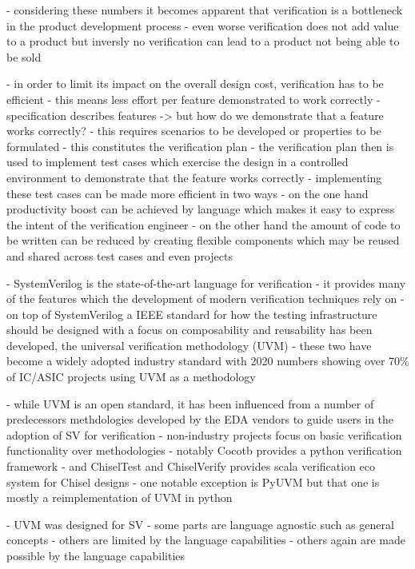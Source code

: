 - considering these numbers it becomes apparent that verification is a bottleneck in the product development process
- even worse verification does not add value to a product but inversly no verification can lead to a product not being able to be sold

- in order to limit its impact on the overall design cost, verification has to be efficient
- this means less effort per feature demonstrated to work correctly
- specification describes features -> but how do we demonstrate that a feature works correctly?
  - this requires scenarios to be developed or properties to be formulated
  - this constitutes the verification plan
- the verification plan then is used to implement test cases which exercise the design in a controlled environment to demonstrate that the feature works correctly
- implementing these test cases can be made more efficient in two ways
- on the one hand productivity boost can be achieved by language which makes it easy to express the intent of the verification engineer
- on the other hand the amount of code to be written can be reduced by creating flexible components which may be reused and shared across test cases and even projects

- SystemVerilog is the state-of-the-art language for verification
- it provides many of the features which the development of modern verification techniques rely on
- on top of SystemVerilog a IEEE standard for how the testing infrastructure should be designed with a focus on composability and reusability has been developed, the universal verification methodology (UVM)
- these two have become a widely adopted industry standard with 2020 numbers showing over 70\% of IC/ASIC projects using UVM as a methodology \cite{foster2020wilson}


- while UVM is an open standard, it has been influenced from a number of predecessors methdologies developed by the EDA vendors to guide users in the adoption of SV for verification
- non-industry projects focus on basic verification functionality over methodologies
- notably Cocotb provides a python verification framework 
- and ChiselTest and ChiselVerify provides scala verification eco system for Chisel designs
- one notable exception is PyUVM but that one is mostly a reimplementation of UVM in python

- UVM was designed for SV
- some parts are language agnostic such as general concepts
- others are limited by the language capabilities 
- others again are made possible by the language capabilities

